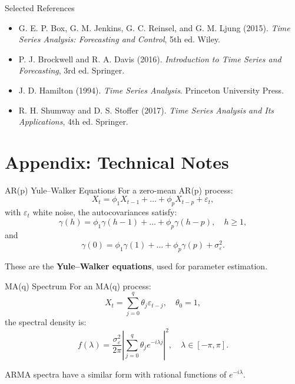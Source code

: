 \documentclass{beamer}
\begin{document}
\begin{frame}{Selected References}
  \small
  \begin{itemize}
    \item G. E. P. Box, G. M. Jenkins, G. C. Reinsel, and G. M. Ljung (2015). \textit{Time Series Analysis: Forecasting and Control}, 5th ed. Wiley.
    \item P. J. Brockwell and R. A. Davis (2016). \textit{Introduction to Time Series and Forecasting}, 3rd ed. Springer.
    \item J. D. Hamilton (1994). \textit{Time Series Analysis}. Princeton University Press.
    \item R. H. Shumway and D. S. Stoffer (2017). \textit{Time Series Analysis and Its Applications}, 4th ed. Springer.
  \end{itemize}
\end{frame}

\contactslide

\appendix


\section{Appendix: Technical Notes}

\begin{frame}{AR(p) Yule--Walker Equations}
  For a zero-mean AR(p) process:
  \[
    X_t = \phi_1 X_{t-1} + \dots + \phi_p X_{t-p} + \varepsilon_t,
  \]
  with $\varepsilon_t$ white noise, the autocovariances satisfy:
  \[
    \gamma(h) = \phi_1 \gamma(h-1) + \dots + \phi_p \gamma(h-p), \quad h \ge 1,
  \]
  and
  \[
    \gamma(0) = \phi_1 \gamma(1) + \dots + \phi_p \gamma(p) + \sigma_\varepsilon^2.
  \]

  \vspace{0.3cm}
  These are the \textbf{Yule--Walker equations}, used for parameter estimation.
\end{frame}

\begin{frame}{MA(q) Spectrum}
  For an MA(q) process:
  \[
    X_t = \sum_{j=0}^{q} \theta_j \varepsilon_{t-j}, \quad \theta_0 = 1,
  \]
  the spectral density is:
  \[
    f(\lambda) = \frac{\sigma_\varepsilon^2}{2\pi}
    \left| \sum_{j=0}^{q} \theta_j e^{-i \lambda j} \right|^2,
    \quad \lambda \in [-\pi, \pi].
  \]

  \vspace{0.3cm}
  ARMA spectra have a similar form with rational functions of $e^{-i\lambda}$.
\end{frame}
\end{document}
